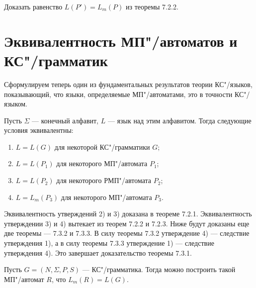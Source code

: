 \begin{myproblem}
Доказать равенство $L(P')=L_m(P)$ из теоремы 7.2.2.
\end{myproblem}

\section {Эквивалентность МП"/автоматов и КС"/грамматик}
\label{Chapter8GrammarEqFSM}

Сформулируем теперь один из фундаментальных результатов теории КС"/языков, показывающий, что языки, определяемые МП"/автоматами, это в точности КС"/языком.

\begin{mytheorem}
Пусть $\Sigma$ --- конечный алфавит, $L$ --- язык над этим алфавитом. Тогда следующие условия эквивалентны:
\begin{enumerate}
\item $L=L(G)$ для некоторой КС"/грамматики $G$;
\item $L=L(P_1)$ для некоторого МП"/автомата $P_1$;
\item $L=L(P_2)$ для некоторого РМП"/автомата $P_2$;
\item $L=L_m(P_3)$ для некоторого МП"/автомата $P_3$.
\end{enumerate}
\end{mytheorem}

\begin{myproof}
Эквивалентность утверждений 2) и 3) доказана в теореме 7.2.1. Эквивалентность утверждении 3) и 4) вытекает из теорем 7.2.2 и 7.2.3. Ниже будут доказаны еще две теоремы --- 7.3.2 и 7.3.3. В силу теоремы 7.3.2 утверждение 4) --- следствие утверждения 1), а в силу теоремы 7.3.3 утверждение 1) --- следствие утверждения 4). Это завершает доказательство теоремы 7.3.1.
\end{myproof}

\begin{mytheorem}\label{cfg2pda}
Пусть $G=(N,\Sigma,P,S)$ --- КС"/грамматика. Тогда можно построить такой МП"/автомат $R$, что $L_m(R)=L(G)$.
\end{mytheorem}

